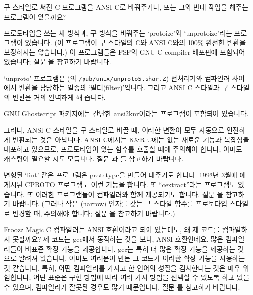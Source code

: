 \begin{faq}
	구 스타일로 써진 C 프로그램을 ANSI C로 바꿔주거나, 또는 그와
	반대 작업을 해주는 프로그램이 있을까요?

\A	프로토타입을 쓰는 새 방식과, 구 방식을 바꿔주는 `protoize'와
	`unprotoize'라는 프로그램이 있습니다.
	(이 프로그램이 구 스타일의 C와 ANSI C와의 100\% 완전한
	변환을 보장하지는 않습니다.) 이 프로그램들은
	FSF의 GNU C compiler 배포판에 포함되어 있습니다; 질문
	을 참고하기 바랍니다.

	`unproto' 프로그램은 (의
	\verb+/pub/unix/unproto5.shar.Z+) 전처리기와 컴파일러 사이에서
	변환을 담당하는 일종의 `필터(filter)'입니다.  그리고
	ANSI C 스타일과 구 스타일의 변환을 거의 완벽하게 해 줍니다.

	GNU Ghostscript 패키지에는 간단한 ansi2knr이라는 프로그램이 포함되어
	있습니다.

	그러나, ANSI C 스타일을 구 스타일로 바꿀 때, 이러한 변환이 모두
	자동으로 안전하게 변환되는 것은 아닙니다.  ANSI C에서는
	K\&R C에는 없는 새로운 기능과 복잡성을 내포하고 있으므로,
	프로토타입이 있는 함수를 호출할 때에 주의해야 합니다; 아마도
	캐스팅이 필요할 지도 모릅니다.  질문 과 를 참고하기 바랍니다.

	변형된 `lint' 같은 프로그램은 prototype을 만들어 내주기도 합니다.
	1992년 3월에 에 게시된 CPROTO 프로그램도
	이런 기능을 합니다.  또 ``cextract''라는 프로그램도 있습니다.
	또 이러한 프로그램들이 컴파일러와 함께 제공되기도 합니다.
	질문 을 참고하기 바랍니다.  (그러나 작은 (narrow) 인자를
	갖는 구 스타일 함수를 프로토타입 스타일로 변경할 때, 주의해야
	합니다; 질문 을 참고하기 바랍니다.)
\end{faq}

\begin{faq}
	Froozz Magic C 컴파일러는 ANSI 호환이라고 되어 있는데도,
	왜 제 코드를 컴파일하지 못할까요? 제 코드는 gcc에서 동작하는 것을
	보니, ANSI 호환인데요.
\A
	많은 컴파일러들이 비표준 확장 기능을 제공합니다.  gcc는 특히
	더 많은 확장 기능을 제공하는 것으로 알려져 있습니다.
	아마도 여러분이 만든 그 코드가 이러한 확장 기능을 사용하는
	것 같습니다.  특히, 어떤 컴파일러를 가지고 한 언어의 성질을
	검사한다는 것은 매우 위험합니다; 어떤 표준은 구현 방법에 따라
	여러 가지 방법을 선택할 수 있도록 하고 있을 수 있으며,
	컴파일러가 잘못된 경우도 많기 때문입니다.  질문 를 참고하기
	바랍니다.
\end{faq}

